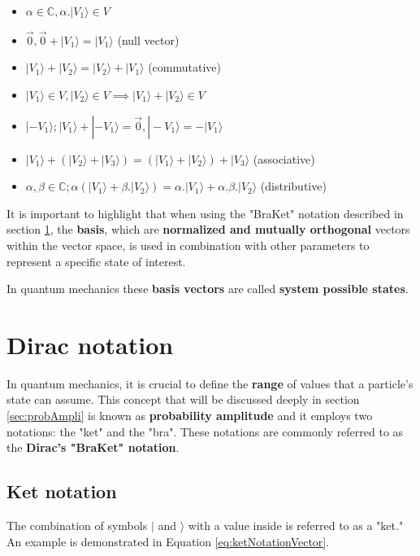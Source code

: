 		\begin{itemize}
			\item $\alpha \in \mathbb{C}, \alpha . |V_1\rangle \in V$
			\item $\vec{0} , \vec{0} + |V_1\rangle = |V_1\rangle$ (null vector)
			\item $|V_1\rangle + |V_2\rangle = |V_2\rangle + |V_1\rangle$ (commutative)
			\item $|V_1\rangle \in V, |V_2\rangle \in V \implies |V_1\rangle + |V_2\rangle \in V$
			\item $|-V_1\rangle; |V_1\rangle + |-V_1\rangle=\vec{0}, |-V_1\rangle=-|V_1\rangle$ 
			\item $|V_1\rangle + (|V_2\rangle + |V_3\rangle) = (|V_1\rangle + |V_2\rangle) + |V_3\rangle$ (associative)
			\item $\alpha,\beta \in \mathbb{C}; \alpha (|V_1\rangle + \beta . |V_2\rangle) = \alpha . |V_1\rangle + \alpha . \beta . |V_2\rangle $ (distributive)
		\end{itemize}

		\par It is important to highlight that when using the "BraKet" notation described in section \ref{sec:DiracNotation}, the \textbf{basis}, which are \textbf{normalized and mutually orthogonal} vectors within the vector space, is used in combination with other parameters to represent a specific state of interest.\newline
		
		\par In quantum mechanics these \textbf{basis vectors} are called \textbf{system possible states}.
	
	\section{Dirac notation}
		\label{sec:DiracNotation}
			
		\par In quantum mechanics, it is crucial to define the \textbf{range} of values that a particle's state can assume. This concept that will be discussed deeply in section \ref{sec:probAmpli} is known as \textbf{probability amplitude} and it employs two notations: the "ket" and the "bra". These notations are commonly referred to as the \textbf{Dirac's "BraKet" notation}.

		\subsection{Ket notation}
			\label{sec:ketNotation}
			\par The combination of symbols $|$ and $\rangle$ with a value inside is referred to as a "ket." An example is demonstrated in Equation \ref{eq:ketNotationVector}.
			
